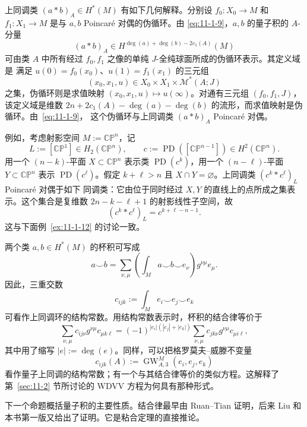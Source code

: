 \begin{remark}\label{rem:11-1-9}
上同调类 $(a*b)_A\in H^*(M)$ 有如下几何解释。分别设
$f_0:X_0\to M$ 和 $f_1:X_1\to M$ 是与 $a,b$ Poincaré 对偶的伪循环。由
\eqref{eq:11-1-9}，$a,b$ 的量子积的 $A$-分量
\[
  (a*b)_A\in H^{\deg(a)+\deg(b)-2c_1(A)}(M)
\]
可由类 $A$ 中所有经过 $f_0,f_1$ 之像的单纯 $J$-全纯球面所成的伪循环表示。其定义域是
满足 $u(0)=f_0(x_0)$、$u(1)=f_1(x_1)$ 的三元组
\[
  (x_0,x_1,u)\in X_0\times X_1\times\mathcal M^*(A;J)
\]
之集，伪循环则是求值映射 $(x_0,x_1,u)\mapsto u(\infty)$。对通有三元组
$(f_0,f_1,J)$，该定义域是维数
$2n+2c_1(A)-\deg(a)-\deg(b)$ 的流形，而求值映射是伪循环。由~\eqref{eq:11-1-9}，
这个伪循环与上同调类 $(a*b)_A$ Poincaré 对偶。

例如，考虑射影空间 $M:=\mathbb{CP}^n$，记
\[
  L:=[\mathbb{CP}^1]\in H_2(\mathbb{CP}^n),\qquad
  c:=\operatorname{PD}([\mathbb{CP}^{n-1}])\in H^2(\mathbb{CP}^n).
\]
用一个 $(n-k)$-平面 $X\subset\mathbb{CP}^n$ 表示类 $\operatorname{PD}(c^k)$，用一个
$(n-\ell)$-平面 $Y\subset\mathbb{CP}^n$ 表示 $\operatorname{PD}(c^\ell)$。假定
$k+\ell>n$ 且 $X\cap Y=\varnothing$。上同调类 $(c^k*c^\ell)_L$ Poincaré 对偶于如下
同调类：它由位于同时经过 $X,Y$ 的直线上的点所成之集表示。这个集合是复维数
$2n-k-\ell+1$ 的射影线性子空间，故
\[
  (c^k*c^\ell)_L=c^{k+\ell-n-1}.
\]
这与下面例~\ref{ex:11-1-12} 的讨论一致。
\end{remark}

\begin{remark}\label{rem:11-1-10}
两个类 $a,b\in H^*(M)$ 的杯积可写成
\[
  a\smile b=\sum_{\nu,\mu}
  \left(\int_Ma\smile b\smile e_\nu\right)g^{\nu\mu}e_\mu.
\]
因此，三重交数
\[
  c_{ijk}:=\int_Me_i\smile e_j\smile e_k
\]
可看作上同调环的结构常数。用结构常数表示时，杯积的结合律等价于
\begin{equation}\label{eq:11-1-10}
  \sum_{\nu,\mu}c_{ij\nu}g^{\nu\mu}c_{\mu k\ell}
  =(-1)^{|e_i|(|e_j|+|e_k|)}
  \sum_{\nu,\mu}c_{jk\nu}g^{\nu\mu}c_{\mu i\ell},
\end{equation}
其中用了缩写 $|e|:=\deg(e)$。同样，可以把格罗莫夫--威滕不变量
\[
  c_{ijk}(A):=\operatorname{GW}_{A,3}^M(e_i,e_j,e_k)
\]
看作量子上同调的结构常数；有一个与其结合律等价的类似方程。这解释了
第~\ref{sec:11-2} 节所讨论的 WDVV 方程为何具有那种形式。
\end{remark}

下一个命题概括量子积的主要性质。结合律最早由 Ruan--Tian  证明，后来
Liu  和本书第一版又给出了证明。它是粘合定理的直接推论。


